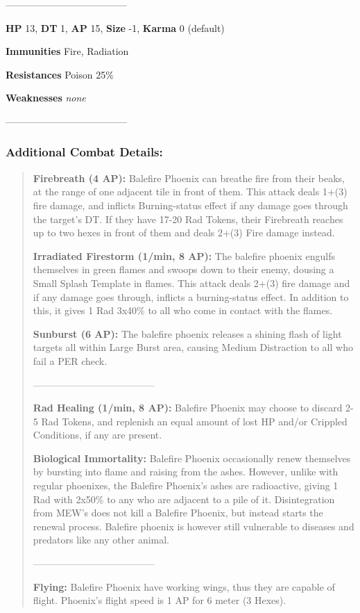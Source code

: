 \documentclass[11pt,a4paper,twocolumn]{book}
\begin{document}
	--------------------------------------
	
	\noindent
	\textbf{HP} 13, \textbf{DT} 1, \textbf{AP} 15, \textbf{Size} -1, \textbf{Karma} 0 (default)
	
	
	\noindent
	\textbf{Immunities} Fire, Radiation
	
	\noindent
	\textbf{Resistances} Poison 25\%
	
	\noindent
	\textbf{Weaknesses} \emph{none} %
	
	--------------------------------------



	\subsubsection*{Additional Combat Details:}
	\begin{verse}
		
	\textbf{Firebreath (4 AP):} Balefire Phoenix can breathe fire from their beaks, at the range of one adjacent tile in front of them. This attack deals 1+(3) fire damage, and inflicts Burning-status effect if any damage goes through the target's DT. If they have 17-20 Rad Tokens, their Firebreath reaches up to two hexes in front of them and deals 2+(3) Fire damage instead.
	
	\textbf{Irradiated Firestorm (1/min, 8 AP):} The balefire phoenix engulfs themselves in green flames and swoops down to their enemy, dousing a Small Splash Template in flames. This attack deals 2+(3) fire damage and if any damage goes through, inflicts a burning-status effect. In addition to this, it gives 1 Rad 3x40\% to all who come in contact with the flames.
	
	\textbf{Sunburst (6 AP):} The balefire phoenix releases a shining flash of light targets all within Large Burst area, causing Medium Distraction to all who fail a PER check.
	
	--------------------------------------	
	
	\textbf{Rad Healing (1/min, 8 AP):} Balefire Phoenix may choose to discard 2-5 Rad Tokens, and replenish an equal amount of lost HP and/or Crippled Conditions, if any are present.
	
	\textbf{Biological Immortality:} Balefire Phoenix occasionally renew themselves by bursting into flame and raising from the ashes. However, unlike with regular phoenixes, the Balefire Phoenix's ashes are radioactive, giving 1 Rad with 2x50\% to any who are adjacent to a pile of it. Disintegration from MEW's does not kill a Balefire Phoenix, but instead starts the renewal process. Balefire phoenix is however still vulnerable to diseases and predators like any other animal.
	
	--------------------------------------	
	
	\textbf{Flying:} Balefire Phoenix have working wings, thus they are capable of flight. Phoenix's flight speed is 1 AP for 6 meter (3 Hexes).
		
	\end{verse}
\end{document}
